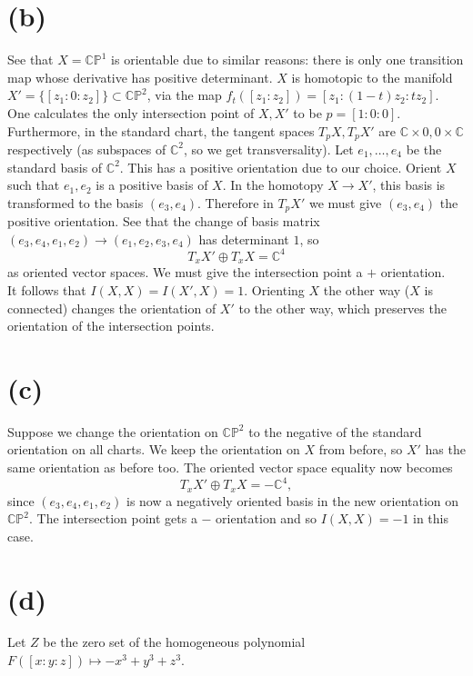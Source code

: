 \documentclass{amsbook}
\theoremstyle{theorem}
\theoremstyle{plain}
\theoremstyle{remark}
\newcommand{\C}{\mathbb C}
\renewcommand{\P}{\mathbb P}
\begin{document}
\section*{(b)}
See that $X = \C\P^1$ is orientable due to similar reasons: there is only one transition map whose derivative has positive determinant. $X$ is homotopic to the manifold $X' = \{[z_1:0:z_2]\} \subset \C\P^2$, via the map $f_t([z_1:z_2]) = [z_1: (1-t)z_2: tz_2]$. One calculates the only intersection point of $X,X'$ to be $p = [1:0:0]$. Furthermore, in the standard chart, the tangent spaces $T_pX, T_pX'$ are $\C\times 0, 0\times \C$ respectively (as subspaces of $\C^2$, so we get transversality). Let $e_1, \dots, e_4$ be the standard basis of $\C^2$. This has a positive orientation due to our choice. Orient $X$ such that $e_1, e_2$ is a positive basis of $X$. In the homotopy $X\to X'$, this basis is transformed to the basis $(e_3, e_4)$. Therefore in $T_pX'$ we must give $(e_3, e_4)$ the positive orientation. See that the change of basis matrix $(e_3,e_4,e_1,e_2) \to (e_1,e_2,e_3,e_4)$ has determinant $1$, so \[T_xX'\oplus T_xX = \C^4\] as oriented vector spaces. We must give the intersection point a $+$ orientation.\\

It follows that $I(X,X) = I(X',X) = 1$. Orienting $X$ the other way ($X$ is connected) changes the orientation of $X'$ to the other way, which preserves the orientation of the intersection points.

\section*{(c)}

Suppose we change the orientation on $\C\P^2$ to the negative of the standard orientation on all charts. We keep the orientation on $X$ from before, so $X'$ has the same orientation as before too. The oriented vector space equality now becomes \[T_xX' \oplus T_xX = -\C^4,\] since $(e_3,e_4,e_1,e_2)$ is now a negatively oriented basis in the new orientation on $\C\P^2$. The intersection point gets a $-$ orientation and so $I(X,X) = -1$ in this case.

\section*{(d)}
Let $Z$ be the zero set of the homogeneous polynomial $F([x:y:z]) \mapsto -x^3 + y^3 + z^3$.\\
\end{document}
